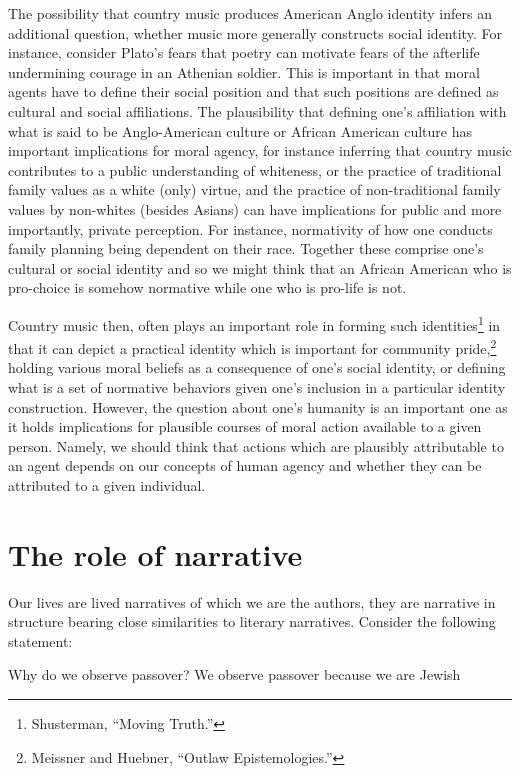 \documentclass[phdthesis,12pt,final,a4paper]{wuthesis}
\theoremstyle{definition}
\theoremstyle{definition}
\theoremstyle{definition}
\theoremstyle{definition}
\theoremstyle{remark}
\begin{document}
The possibility that country music produces American Anglo identity infers an additional question, whether music more generally constructs social identity. For instance, consider Plato's fears that poetry can motivate fears of the afterlife undermining courage in an Athenian soldier. This is important in that moral agents have to define their social position and that such positions are defined as cultural and social affiliations. The plausibility that defining one's affiliation with what is said to be Anglo-American culture or African American culture has important implications for moral agency, for instance inferring that country music contributes to a public understanding of whiteness, or the practice of traditional family values as a white (only) virtue, and the practice of non-traditional family values by non-whites (besides Asians) can have implications for public and more importantly, private perception. For instance, normativity of how one conducts family planning being dependent on their race. Together these comprise one's cultural or social identity and so we might think that an African American who is pro-choice is somehow normative while one who is pro-life is not.

Country music then, often plays an important role in forming such identities\footnote{Shusterman, {``Moving {Truth}.''}} in that it can depict a practical identity which is important for community pride,\footnote{Meissner and Huebner, {``Outlaw Epistemologies.''}} holding various moral beliefs as a consequence of one's social identity, or defining what is a set of normative behaviors given one's inclusion in a particular identity construction. However, the question about one's humanity is an important one as it holds implications for plausible courses of moral action available to a given person. Namely, we should think that actions which are plausibly attributable to an agent depends on our concepts of human agency and whether they can be attributed to a given individual.

\section{The role of narrative}\label{the-role-of-narrative}

Our lives are lived narratives of which we are the authors, they are narrative in structure bearing close similarities to literary narratives. Consider the following statement:

Why do we observe passover? We observe passover because we are Jewish
\end{document}
